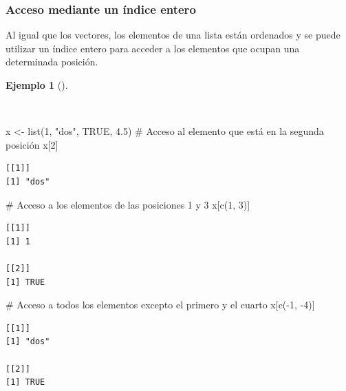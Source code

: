\documentclass[
  a4paper,
]{scrreport}
\newenvironment{Shaded}{\begin{snugshade}}{\end{snugshade}}
\newcommand{\CommentTok}[1]{\textcolor[rgb]{0.37,0.37,0.37}{#1}}
\newcommand{\ConstantTok}[1]{\textcolor[rgb]{0.56,0.35,0.01}{#1}}
\newcommand{\DecValTok}[1]{\textcolor[rgb]{0.68,0.00,0.00}{#1}}
\newcommand{\FloatTok}[1]{\textcolor[rgb]{0.68,0.00,0.00}{#1}}
\newcommand{\FunctionTok}[1]{\textcolor[rgb]{0.28,0.35,0.67}{#1}}
\newcommand{\NormalTok}[1]{\textcolor[rgb]{0.00,0.23,0.31}{#1}}
\newcommand{\OtherTok}[1]{\textcolor[rgb]{0.00,0.23,0.31}{#1}}
\newcommand{\SpecialCharTok}[1]{\textcolor[rgb]{0.37,0.37,0.37}{#1}}
\newcommand{\StringTok}[1]{\textcolor[rgb]{0.13,0.47,0.30}{#1}}
\theoremstyle{definition}
\theoremstyle{definition}
\newtheorem{example}{Ejemplo}[chapter]
\theoremstyle{remark}
\begin{document}
\hypertarget{acceso-mediante-un-uxedndice-entero-1}{%
\subsubsection{Acceso mediante un índice
entero}\label{acceso-mediante-un-uxedndice-entero-1}}

Al igual que los vectores, los elementos de una lista están ordenados y
se puede utilizar un índice entero para acceder a los elementos que
ocupan una determinada posición.

\begin{example}[]\protect\hypertarget{exm-acceso-lista-indice-entero}{}\label{exm-acceso-lista-indice-entero}

~

\begin{Shaded}
\begin{Highlighting}[]
\NormalTok{x }\OtherTok{\textless{}{-}} \FunctionTok{list}\NormalTok{(}\DecValTok{1}\NormalTok{, }\StringTok{"dos"}\NormalTok{, }\ConstantTok{TRUE}\NormalTok{, }\FloatTok{4.5}\NormalTok{)}
\CommentTok{\# Acceso al elemento que está en la segunda posición}
\NormalTok{x[}\DecValTok{2}\NormalTok{]}
\end{Highlighting}
\end{Shaded}

\begin{verbatim}
[[1]]
[1] "dos"
\end{verbatim}

\begin{Shaded}
\begin{Highlighting}[]
\CommentTok{\# Acceso a los elementos de las posiciones 1 y 3}
\NormalTok{x[}\FunctionTok{c}\NormalTok{(}\DecValTok{1}\NormalTok{, }\DecValTok{3}\NormalTok{)]}
\end{Highlighting}
\end{Shaded}

\begin{verbatim}
[[1]]
[1] 1

[[2]]
[1] TRUE
\end{verbatim}

\begin{Shaded}
\begin{Highlighting}[]
\CommentTok{\# Acceso a todos los elementos excepto el primero y el cuarto}
\NormalTok{x[}\FunctionTok{c}\NormalTok{(}\SpecialCharTok{{-}}\DecValTok{1}\NormalTok{, }\SpecialCharTok{{-}}\DecValTok{4}\NormalTok{)]}
\end{Highlighting}
\end{Shaded}

\begin{verbatim}
[[1]]
[1] "dos"

[[2]]
[1] TRUE
\end{verbatim}

\end{example}
\end{document}
